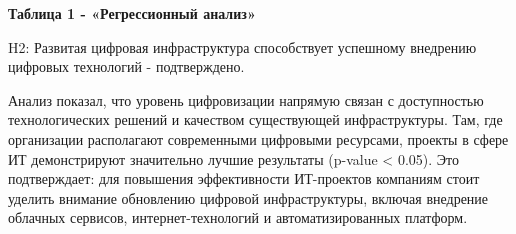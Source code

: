{\bfseries Таблица 1 - «Регрессионный анализ»}


H2: Развитая цифровая инфраструктура способствует успешному внедрению
цифровых технологий - подтверждено.

Анализ показал, что уровень цифровизации напрямую связан с доступностью
технологических решений и качеством существующей инфраструктуры. Там,
где организации располагают современными цифровыми ресурсами, проекты в
сфере ИТ демонстрируют значительно лучшие результаты (p-value
\textless{} 0.05). Это подтверждает: для повышения эффективности
ИТ-проектов компаниям стоит уделить внимание обновлению цифровой
инфраструктуры, включая внедрение облачных сервисов, интернет-технологий
и автоматизированных платформ.

